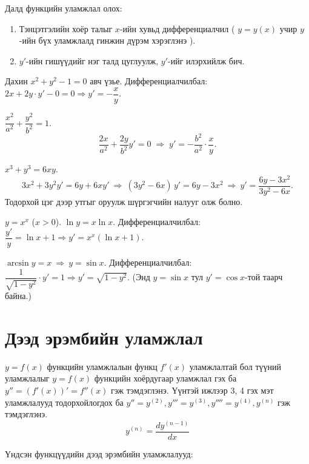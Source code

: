 \begin{remark}
Далд функцийн уламжлал олох:
\begin{enumerate}
  \item Тэнцэтгэлийн хоёр талыг $x$-ийн хувьд дифференциалчил ( $y=y(x)$ учир $y$-ийн бүх уламжлалд гинжин дүрэм хэрэглэнэ ).
  \item $y'$-ийн гишүүдийг нэг талд цуглуулж, $y'$-ийг илэрхийлж бич.
\end{enumerate}
\end{remark}
\begin{example}
Дахин $x^2+y^2-1=0$ авч үзье.
Дифференциалчилбал: $2x+2y\cdot y'-0=0\Rightarrow y'=-\dfrac{x}{y}$.
\end{example}
\begin{example}
$\dfrac{x^2}{a^2}+\dfrac{y^2}{b^2}=1$.
\[
\frac{2x}{a^2}+\frac{2y}{b^2}y'=0
\;\Rightarrow\;
y'=-\frac{b^2}{a^2}\cdot \frac{x}{y}.
\]
\end{example}

\begin{example}
$x^3+y^3=6xy$.
\[
3x^2+3y^2 y'=6y+6x y'
\ \Rightarrow\
(3y^2-6x)\,y'=6y-3x^2
\ \Rightarrow\
y'=\frac{6y-3x^2}{3y^2-6x}.
\]
Тодорхой цэг дээр утгыг оруулж шүргэгчийн налууг олж болно.
\end{example}

\begin{example}
$y=x^x$ ($x>0$). $\ln y=x\ln x$.
Дифференциалчилбал: $\dfrac{y'}{y}=\ln x+1 \Rightarrow y'=x^x(\ln x+1)$.
\end{example}

\begin{example}
$\arcsin y = x \ \Rightarrow\ y=\sin x$. 
Дифференциалчилбал: $\dfrac{1}{\sqrt{1-y^2}}\cdot y'=1 \Rightarrow y'=\sqrt{1-y^2}$.
(Энд $y=\sin x$ тул $y'=\cos x$-той таарч байна.)
\end{example}
\section{Дээд эрэмбийн уламжлал}
\begin{definition}
    $y=f(x)$ функцийн уламжлалын функц $f'(x)$ уламжлалтай бол түүний уламжлалыг $y=f(x)$ функцийн хоёрдугаар уламжлал гэх ба $y''=(f'(x))'=f''(x)$ гэж тэмдэглэнэ. Үүнтэй ижлээр 3, 4 гэх мэт уламжлалууд тодорхойлогдох ба $y''=y^{(2)}, y'''=y^{(3)}, y''''=y^{(4)}, y^{(n)}$ гэж тэмдэглэнэ. 
    $$y^{(n)}=\dfrac{d y^{(n-1)}}{dx}$$
\end{definition}
Үндсэн функцүүдийн дээд эрэмбийн уламжлалууд:

